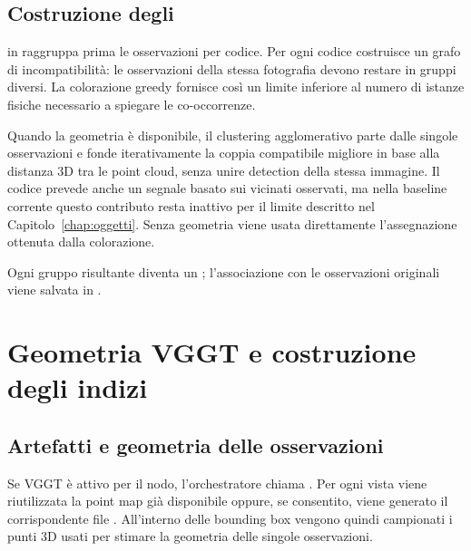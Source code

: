 
\subsection{Costruzione degli }

 in  raggruppa prima le
osservazioni per codice. Per ogni codice costruisce un grafo di incompatibilità:
le osservazioni della stessa fotografia devono restare in gruppi diversi. La
colorazione greedy fornisce così un limite inferiore al numero di istanze
fisiche necessario a spiegare le co-occorrenze.

Quando la geometria è disponibile, il clustering agglomerativo parte dalle
singole osservazioni e fonde iterativamente la coppia compatibile migliore in
base alla distanza 3D tra le point cloud, senza unire detection della stessa
immagine. Il codice prevede anche un segnale basato sui vicinati osservati, ma
nella baseline corrente questo contributo resta inattivo per il limite descritto
nel Capitolo~\ref{chap:oggetti}. Senza geometria viene usata direttamente
l'assegnazione ottenuta dalla colorazione.

Ogni gruppo risultante diventa un ; l'associazione con le
osservazioni originali viene salvata in .


\section{Geometria VGGT e costruzione degli indizi}

\subsection{Artefatti e geometria delle osservazioni}

Se VGGT è attivo per il nodo, l'orchestratore chiama
. Per ogni vista viene riutilizzata la point map
già disponibile oppure, se consentito, viene generato il corrispondente file
. All'interno delle bounding box vengono quindi campionati i punti
3D usati per stimare la geometria delle singole osservazioni.

